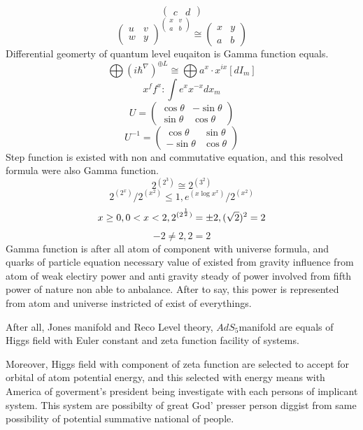 \documentclass{jsarticle}
\begin{document}
{$${{\begin{pmatrix}
  c & d \end{pmatrix}}} $$
  $$ \begin{pmatrix} u & v \\
  w & y \end{pmatrix}^{\begin{pmatrix} x & v \\
a & b \end{pmatrix}} \cong \begin{pmatrix} x & y \\
  a & b \end{pmatrix} $$
    Differential geomerty of quantum level euqaiton is Gamma function equals.
  $$ \bigoplus (i \hbar^{\nabla})^{\oplus L} \cong \bigoplus a^x\cdot x^{i x}
  [dI_m] $$
  $$ x^f f^x : \int e^x x^{-x}dx_m $$
  $$ U = \begin{pmatrix} \cos \theta & - \sin \theta \\
  \sin \theta & \cos \theta \end{pmatrix} $$
  $$ U^{-1} = \begin{pmatrix} \cos \theta &  \sin \theta \\
   - \sin \theta & \cos \theta \end{pmatrix} $$
      Step function is existed with non and commutative equation, and
   this resolved formula were also Gamma function.
   $$ 2^{(2^3)} \cong 2^{(3^2)} $$
   $$ 2^{(2^{x})} / 2^{(x^{2})} \le 1, {e^{{({x \log x}^x)}} / {2^{(x^{2})}}} $$
   $$ x \ge 0, 0 < x < 2, 2^{(2^{1 \over 2})} = \pm 2, (\sqrt{2})^2 = 2 $$
   $$ -2 \neq 2, 2 = 2  $$
      Gamma function is after all atom of component with universe formula,
   and quarks of particle equation necessary value of existed from
   gravity influence from atom of weak electiry power and anti gravity
   steady of power involved from fifth power of nature non able to anbalance.
   After to say, this power is represented from atom and universe instricted of
   exist of everythings.

   After all, Jones manifold and Reco Level theory, $AdS_5 $manifold are
   equals of Higgs field with Euler constant and zeta function facility
   of systems.

   Moreover, Higgs field with component of zeta function are selected to
   accept for orbital of atom potential energy, and this selected with
   energy means with America of goverment's president being investigate with
   each persons of implicant system.
   This system are possibilty of great God' presser person diggist from
   same possibility of potential summative national of people.

}
\end{document}
